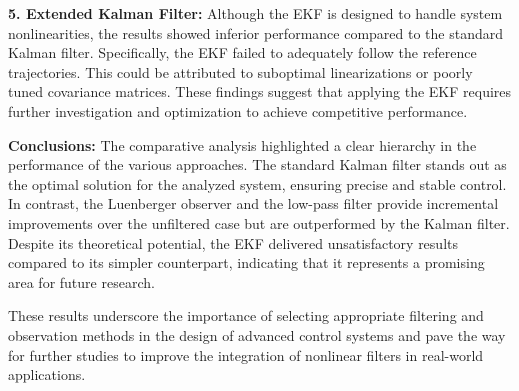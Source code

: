 \textbf{5. Extended Kalman Filter:}
Although the EKF is designed to handle system nonlinearities, the results showed inferior performance compared to the standard Kalman filter. Specifically, the EKF failed to adequately follow the reference trajectories. This could be attributed to suboptimal linearizations or poorly tuned covariance matrices. These findings suggest that applying the EKF requires further investigation and optimization to achieve competitive performance.

\textbf{Conclusions:}
The comparative analysis highlighted a clear hierarchy in the performance of the various approaches. The standard Kalman filter stands out as the optimal solution for the analyzed system, ensuring precise and stable control. In contrast, the Luenberger observer and the low-pass filter provide incremental improvements over the unfiltered case but are outperformed by the Kalman filter. Despite its theoretical potential, the EKF delivered unsatisfactory results compared to its simpler counterpart, indicating that it represents a promising area for future research.

These results underscore the importance of selecting appropriate filtering and observation methods in the design of advanced control systems and pave the way for further studies to improve the integration of nonlinear filters in real-world applications.

